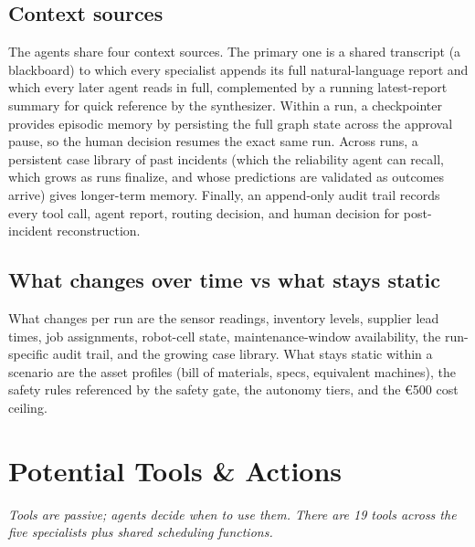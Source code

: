 \documentclass[11pt,a4paper]{article}
\let\oldsection\section
\renewcommand{\section}{\needspace{7\baselineskip}\oldsection}
\let\oldsubsection\subsection
\renewcommand{\subsection}{\needspace{5\baselineskip}\oldsubsection}
\begin{document}
\subsection*{Context sources}
The agents share four context sources. The primary one is a shared transcript (a blackboard) to which every specialist appends its full natural-language report and which every later agent reads in full, complemented by a running latest-report summary for quick reference by the synthesizer. Within a run, a checkpointer provides episodic memory by persisting the full graph state across the approval pause, so the human decision resumes the exact same run. Across runs, a persistent case library of past incidents (which the reliability agent can recall, which grows as runs finalize, and whose predictions are validated as outcomes arrive) gives longer-term memory. Finally, an append-only audit trail records every tool call, agent report, routing decision, and human decision for post-incident reconstruction.

\subsection*{What changes over time vs what stays static}
What changes per run are the sensor readings, inventory levels, supplier lead times, job assignments, robot-cell state, maintenance-window availability, the run-specific audit trail, and the growing case library. What stays static within a scenario are the asset profiles (bill of materials, specs, equivalent machines), the safety rules referenced by the safety gate, the autonomy tiers, and the \euro{}500 cost ceiling.

\section{Potential Tools \& Actions}
\emph{Tools are passive; agents decide when to use them. There are 19 tools across the five specialists plus shared scheduling functions.}
\end{document}
